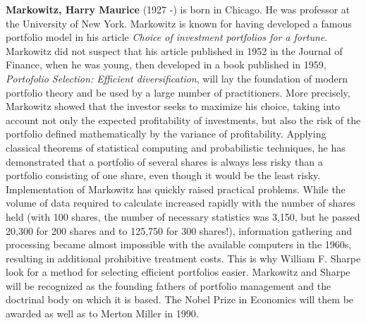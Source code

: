 \textbf{Markowitz, Harry Maurice} (1927 -) is born in Chicago. He was professor at the University of New York. Markowitz is known for having developed a famous portfolio model in his article \textit{Choice of investment portfolios for a fortune}. Markowitz did not suspect that his article published in 1952 in the Journal of Finance, when he was young, then developed in a book published in 1959, \textit{Portofolio Selection: Efficient diversification}, will lay the foundation of modern portfolio theory and be used by a large number of practitioners. More precisely, Markowitz showed that the investor seeks to maximize his choice, taking into account not only the expected profitability of investments, but also the risk of the portfolio defined mathematically by the variance of profitability. Applying classical theorems of statistical computing and probabilistic techniques, he has demonstrated that a portfolio of several shares is always less risky than a portfolio consisting of one share, even though it would be the least risky. Implementation of Markowitz has quickly raised practical problems. While the volume of data required to calculate increased rapidly with the number of shares held (with 100 shares, the number of necessary statistics was 3,150, but he passed 20,300 for 200 shares and to 125,750 for 300 shares!), information gathering and processing became almost impossible with the available computers in the 1960s, resulting in additional prohibitive treatment costs. This is why William F. Sharpe look for a method for selecting efficient portfolios easier. Markowitz and Sharpe will be recognized as the founding fathers of portfolio management and the doctrinal body on which it is based. The Nobel Prize in Economics will them be awarded as well as to Merton Miller in 1990.

